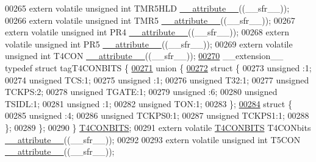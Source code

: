 \begin{DoxyCode}
00265 \textcolor{keyword}{extern} \textcolor{keyword}{volatile} \textcolor{keywordtype}{unsigned} \textcolor{keywordtype}{int}  TMR5HLD \hyperlink{a00015_a493c46f03454991ccc5aa7a6e1dfb2a7}{\_\_attribute\_\_}((\_\_sfr\_\_));
00266 \textcolor{keyword}{extern} \textcolor{keyword}{volatile} \textcolor{keywordtype}{unsigned} \textcolor{keywordtype}{int}  TMR5 \hyperlink{a00015_a493c46f03454991ccc5aa7a6e1dfb2a7}{\_\_attribute\_\_}((\_\_sfr\_\_));
00267 \textcolor{keyword}{extern} \textcolor{keyword}{volatile} \textcolor{keywordtype}{unsigned} \textcolor{keywordtype}{int}  PR4 \hyperlink{a00015_a493c46f03454991ccc5aa7a6e1dfb2a7}{\_\_attribute\_\_}((\_\_sfr\_\_));
00268 \textcolor{keyword}{extern} \textcolor{keyword}{volatile} \textcolor{keywordtype}{unsigned} \textcolor{keywordtype}{int}  PR5 \hyperlink{a00015_a493c46f03454991ccc5aa7a6e1dfb2a7}{\_\_attribute\_\_}((\_\_sfr\_\_));
00269 \textcolor{keyword}{extern} \textcolor{keyword}{volatile} \textcolor{keywordtype}{unsigned} \textcolor{keywordtype}{int}  T4CON \hyperlink{a00015_a493c46f03454991ccc5aa7a6e1dfb2a7}{\_\_attribute\_\_}((\_\_sfr\_\_));
\hypertarget{a00015_source_l00270}{}\hyperlink{a00014}{00270} \_\_extension\_\_ \textcolor{keyword}{typedef} \textcolor{keyword}{struct }tagT4CONBITS \{
\hypertarget{a00015_source_l00271}{}\hyperlink{a00015}{00271}   \textcolor{keyword}{union }\{
\hypertarget{a00015_source_l00272}{}\hyperlink{a00015}{00272}     \textcolor{keyword}{struct }\{
00273       \textcolor{keywordtype}{unsigned} :1;
00274       \textcolor{keywordtype}{unsigned} TCS:1;
00275       \textcolor{keywordtype}{unsigned} :1;
00276       \textcolor{keywordtype}{unsigned} T32:1;
00277       \textcolor{keywordtype}{unsigned} TCKPS:2;
00278       \textcolor{keywordtype}{unsigned} TGATE:1;
00279       \textcolor{keywordtype}{unsigned} :6;
00280       \textcolor{keywordtype}{unsigned} TSIDL:1;
00281       \textcolor{keywordtype}{unsigned} :1;
00282       \textcolor{keywordtype}{unsigned} TON:1;
00283     \};
\hypertarget{a00015_source_l00284}{}\hyperlink{a00015}{00284}     \textcolor{keyword}{struct }\{
00285       \textcolor{keywordtype}{unsigned} :4;
00286       \textcolor{keywordtype}{unsigned} TCKPS0:1;
00287       \textcolor{keywordtype}{unsigned} TCKPS1:1;
00288     \};
00289   \};
00290 \} \hyperlink{a00014_d5/d72/a00803}{T4CONBITS};
00291 \textcolor{keyword}{extern} \textcolor{keyword}{volatile} \hyperlink{a00014_d5/d72/a00803}{T4CONBITS} T4CONbits \hyperlink{a00015_a493c46f03454991ccc5aa7a6e1dfb2a7}{\_\_attribute\_\_}((\_\_sfr\_\_));
00292 
00293 \textcolor{keyword}{extern} \textcolor{keyword}{volatile} \textcolor{keywordtype}{unsigned} \textcolor{keywordtype}{int}  T5CON \hyperlink{a00015_a493c46f03454991ccc5aa7a6e1dfb2a7}{\_\_attribute\_\_}((\_\_sfr\_\_));

\end{DoxyCode}
